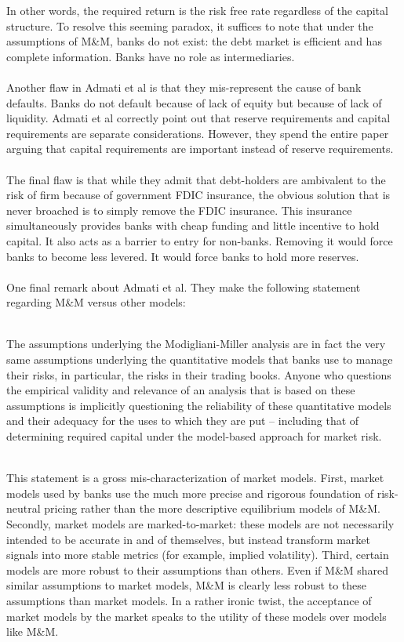 \documentclass{article}
\theoremstyle{definition}
\begin{document}
In other words, the required return is the risk free rate regardless of the capital structure.  To resolve this seeming paradox, it suffices to note that under the assumptions of M\&M, banks do not exist: the debt market is efficient and has complete information.  Banks have no role as intermediaries. 
\\
\\
Another flaw in Admati et al is that they mis-represent the cause of bank defaults.  Banks do not default because of lack of equity but because of lack of liquidity.  Admati et al correctly point out that reserve requirements and capital requirements are separate considerations.  However, they spend the entire paper arguing that capital requirements are important instead of reserve requirements.  
\\
\\
The final flaw is that while they admit that debt-holders are ambivalent to the risk of firm because of government FDIC insurance, the obvious solution that is never broached is to simply remove the FDIC insurance.  This insurance simultaneously provides banks with cheap funding and little incentive to hold capital.  It also acts as a barrier to entry for non-banks.  Removing it would force banks to become less levered.  It would force banks to hold more reserves.  
\\
\\
One final remark about Admati et al.  They make the following statement regarding M\&M versus other models:
\\
\\
\begin{addmargin}[2em]{2em}
The assumptions underlying the Modigliani-Miller analysis are in fact the very same assumptions underlying the quantitative models that  banks  use  to  manage  their risks, in particular, the risks in their trading books. Anyone who questions the empirical validity and relevance of an analysis that is based on these assumptions is implicitly questioning the reliability of these quantitative models and their adequacy for the uses to which they are put – including that of determining required capital under the model-based approach for market risk.
\\
\\
\end{addmargin}

This statement is a gross mis-characterization of market models.  First, market models used by banks use the much more precise and rigorous foundation of risk-neutral pricing rather than the more descriptive equilibrium models of M\&M.  Secondly, market models are marked-to-market: these models are not necessarily intended to be accurate in and of themselves, but instead transform market signals into more stable metrics (for example, implied volatility).  Third, certain models are more robust to their assumptions than others.  Even if M\&M shared similar assumptions to market models, M\&M is clearly less robust to these assumptions than market models.  In a rather ironic twist, the acceptance of market models by the market speaks to the utility of these models over models like M\&M.  
\end{document}
